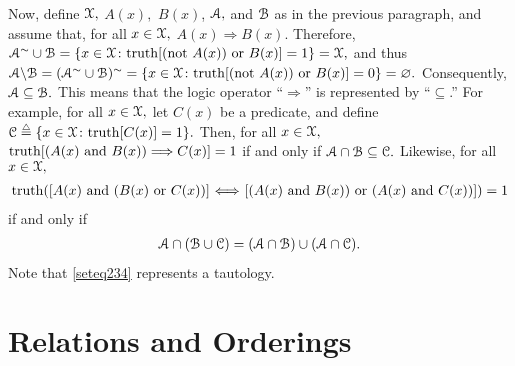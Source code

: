 Now, define ${\mathcal X},$ $A(x),$ $B(x)$, ${\mathcal A},$ and ${\mathcal B}$ as in the previous paragraph, and assume that, for all $x\in{\mathcal X},$ $A(x)\Longrightarrow B(x).$
%
Therefore, ${\mathcal A}^\sim\cup{\mathcal B}= \{x\in{\mathcal X}\colon{\rm truth}[(\mbox{not }A(x))\mbox{ or }B(x)] = 1\} = {\mathcal X},$ and thus
%
${\mathcal A}\backslash{\mathcal B} = ({\mathcal A}^\sim\cup{\mathcal B})^\sim = \{x\in{\mathcal X}\colon {\rm truth}[(\mbox{not }A(x))\mbox{ or }B(x)] = 0\} = \varnothing.$
%
Consequently, ${\mathcal A} \subseteq {\mathcal B}.$
%
%
%
%
%
%
%
%
%
%
%
This means that the logic operator ``$\Longrightarrow$'' is represented by ``$\subseteq$.''
%
For example, for all $x\in{\mathcal X},$ let $C(x)$ be a predicate, and define $\SC\isdef \{x\in\SX\colon {\rm truth}[C(x)] = 1\}.$
%
Then, for all $x\in{\mathcal X},$
%
${\rm truth}[( A(x) \mbox{ and }B(x))\Longrightarrow C(x)]=1$
%
if and only if ${\mathcal A}\cap{\mathcal B} \subseteq {\mathcal C}.$
%
Likewise, for all $x\in{\mathcal X},$
%
\begin{align}{\rm truth}([\mbox{$A(x)$ and ($B(x)$ or $C(x)$)] $\Longleftrightarrow$ [($A(x)$ and $B(x)$) or ($A(x)$ and $C(x)$)}])=1\end{align}
%
if and only if
%
\begin{align}{\mathcal A} \cap({\mathcal B} \cup {\mathcal C} )=({\mathcal A} \cap {\mathcal B} )\cup({\mathcal A} \cap {\mathcal C} ).\label{seteq234}\end{align}
%
Note that \eqref{seteq234} represents a tautology.











\section{Relations and Orderings}
